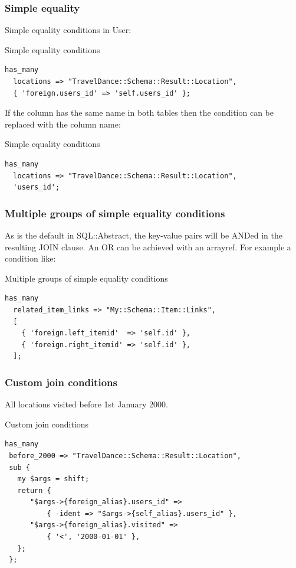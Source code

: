 \subsubsection{Simple equality}

Simple equality conditions
in User:

\begin{frame}[fragile]{Simple equality conditions}
\begin{lstlisting}
has_many
  locations => "TravelDance::Schema::Result::Location",
  { 'foreign.users_id' => 'self.users_id' };
\end{lstlisting}
\end{frame}

If the column has the same name in both tables then the condition can be replaced with the column name:

\begin{frame}[fragile]{Simple equality conditions}
\begin{lstlisting}
has_many
  locations => "TravelDance::Schema::Result::Location",
  'users_id';
\end{lstlisting}
\end{frame}

\subsubsection{Multiple groups of simple equality conditions}

As is the default in SQL::Abstract, the key-value pairs will be ANDed in the
resulting JOIN clause. An OR can be achieved with an arrayref. For example a
condition like:

\begin{frame}[fragile]{Multiple groups of simple equality conditions}
\begin{lstlisting}
has_many
  related_item_links => "My::Schema::Item::Links",
  [
    { 'foreign.left_itemid'  => 'self.id' },
    { 'foreign.right_itemid' => 'self.id' },
  ];
\end{lstlisting}
\end{frame}

\subsubsection{Custom join conditions}

All locations visited before 1st January 2000.

\begin{frame}[fragile]{Custom join conditions}
\begin{lstlisting}
has_many
 before_2000 => "TravelDance::Schema::Result::Location",
 sub {
   my $args = shift;
   return {
      "$args->{foreign_alias}.users_id" =>
          { -ident => "$args->{self_alias}.users_id" },
      "$args->{foreign_alias}.visited" =>
          { '<', '2000-01-01' },
   };
 };
\end{lstlisting}
\end{frame}

